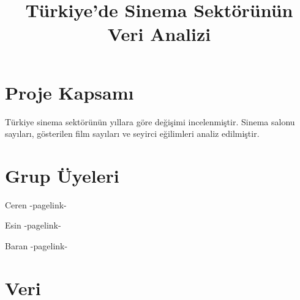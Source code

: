 \documentclass[
  letterpaper,
  DIV=11,
  numbers=noendperiod]{scrartcl}
\title{Türkiye'de Sinema Sektörünün Veri Analizi}
\author{}
\date{}
\begin{document}
\maketitle


\section{Proje Kapsamı}\label{proje-kapsamux131}

Türkiye sinema sektörünün yıllara göre değişimi incelenmiştir. Sinema
salonu sayıları, gösterilen film sayıları ve seyirci eğilimleri analiz
edilmiştir.

\section{Grup Üyeleri}\label{grup-uxfcyeleri}

Ceren -pagelink-

Esin -pagelink-

Baran -pagelink-

\section{Veri}\label{veri}
\end{document}
